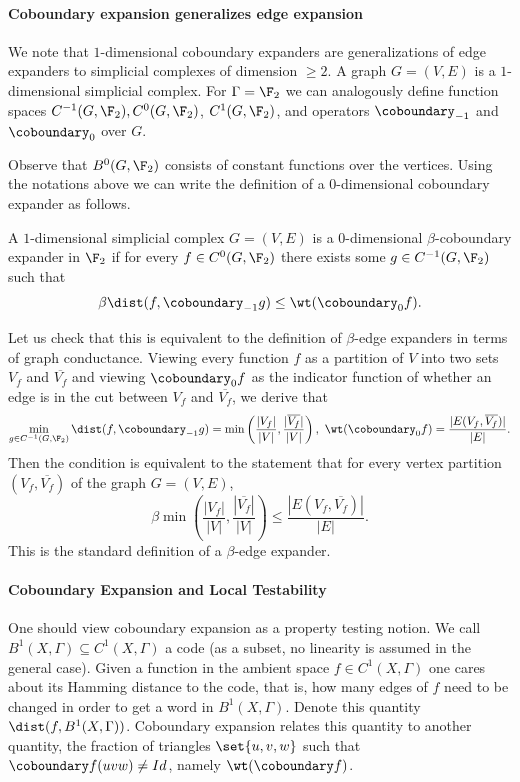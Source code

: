 \paragraph{Coboundary expansion generalizes edge expansion} We note that $1$-dimensional coboundary expanders are generalizations of edge expanders to simplicial complexes of dimension $\ge 2$. A graph $G = (V,E)$ is a $1$-dimensional simplicial complex. For $\Gamma = \F_2$ we can analogously define function spaces $C^{-1}(G,\F_2), C^{0}(G,\F_2)$, $C^{1}(G,\F_2)$, and operators $\coboundary_{-1}$ and $\coboundary_{0}$ over $G$. 

Observe that $B^0(G,\F_2)$ consists of constant functions over the vertices. 
Using the notations above we can write the definition of a $0$-dimensional coboundary expander as follows. 
    \begin{definition}
        A $1$-dimensional simplicial complex $G=(V,E)$ is a $0$-dimensional $\beta$-coboundary expander in $\F_2$ if for every $f \in C^0(G,\F_2)$ there exists some $g \in C^{-1}(G,\F_2)$ such that 
\begin{equation}\label{eq:edge-expansion}
        \beta \dist(f,\coboundary_{-1} g) \leq \wt(\coboundary_0 f).
    \end{equation}
    
    \end{definition}
    Let us check that this is equivalent to the definition of $\beta$-edge expanders in terms of graph conductance. 
    Viewing every function $f$
    as a partition of $V$ into two sets $V_f$ and $\overline{V_f}$ and viewing $\coboundary_0 f$ as the indicator function of whether an edge is in the cut between $V_f$ and $\overline{V_f}$, we derive that 
    \[ \min_{g\in C^{-1}(G,\F_2)}\dist(f,\coboundary_{-1} g) =  \min\left(\frac{|V_f|}{|V|},\frac{|\overline{V_f}|}{|V|}\right), ~\wt(\coboundary_0 f) = \frac{|E(V_f,\overline{V_f})|}{|E|}.\]
    Then the condition  is equivalent to the statement that for every vertex partition $(V_f,\overline{V_f})$ of the graph $G=(V,E)$,    
    \[\beta \min\left(\frac{|V_f|}{|V|},\frac{|\overline{V_f}|}{|V|}\right) \leq \frac{|E(V_f,\overline{V_f})|}{|E|}.\]
    This is the standard definition of a $\beta$-edge expander.


\paragraph{Coboundary Expansion and Local Testability}One should view coboundary expansion as a property testing notion. We call \(B^1(X,\Gamma) \subseteq C^1(X,\Gamma)\) a code (as a subset, no linearity is assumed in the general case). Given a function in the ambient space \(f \in C^1(X,\Gamma)\) one cares about its Hamming distance to the code, that is, how many edges of \(f\) need to be changed in order to get a word in \(B^1(X,\Gamma)\). Denote this quantity \(\dist(f,B^1(X,\Gamma))\). Coboundary expansion relates this quantity to another quantity, the fraction of triangles \(\set{u,v,w}\) such that \(\coboundary f(uvw) \ne Id\), namely \(\wt(\coboundary f)\).

